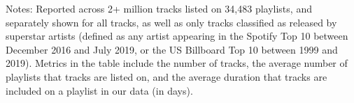\begin{table}[H]
\caption{Content characteristics across music labels.\label{tab:content}}
\smallskip{}
\raggedright{}

\begin{flushleft}
\vspace{-0.1cm}
\footnotesize{Notes: Reported across 2+ million tracks listed on 34,483 playlists, and separately shown for all tracks, as well as only tracks classified as released by superstar artists (defined as any artist appearing in the Spotify Top 10 between December 2016 and July 2019, or the US Billboard Top 10 between 1999 and 2019). Metrics in the table include the number of tracks, the average number of playlists that tracks are listed on, and the average duration that tracks are included on a playlist in our data (in days).}
\end{flushleft}
\end{table}
